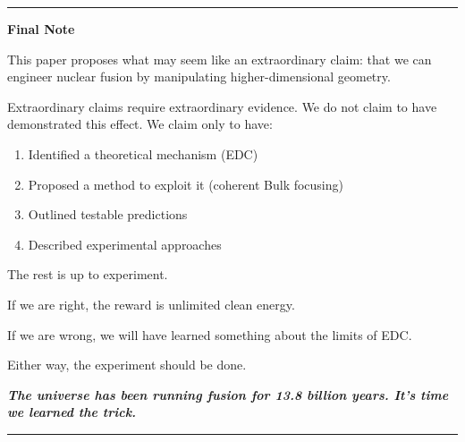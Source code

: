 \documentclass[12pt,a4paper]{article}
\begin{document}
\begin{center}
\rule{0.8\textwidth}{0.4pt}

\textbf{Final Note}

\vspace{0.5cm}

This paper proposes what may seem like an extraordinary claim: that we can engineer nuclear fusion by manipulating higher-dimensional geometry.

Extraordinary claims require extraordinary evidence. We do not claim to have demonstrated this effect. We claim only to have:

\begin{enumerate}
    \item Identified a theoretical mechanism (EDC)
    \item Proposed a method to exploit it (coherent Bulk focusing)
    \item Outlined testable predictions
    \item Described experimental approaches
\end{enumerate}

The rest is up to experiment.

If we are right, the reward is unlimited clean energy.

If we are wrong, we will have learned something about the limits of EDC.

Either way, the experiment should be done.

\vspace{0.5cm}

\textit{\textbf{The universe has been running fusion for 13.8 billion years. It's time we learned the trick.}}

\rule{0.8\textwidth}{0.4pt}
\end{center}
\end{document}
